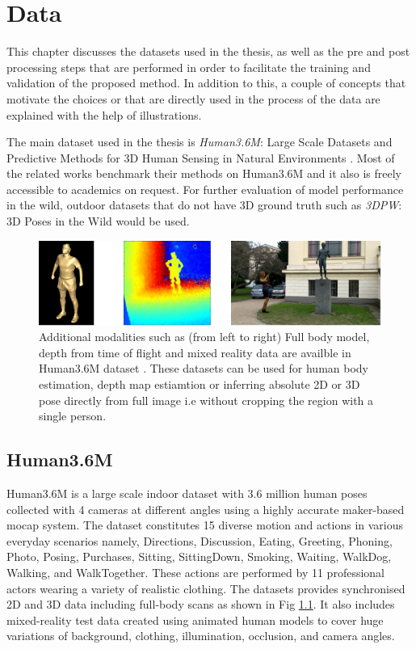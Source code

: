 \chapter{Data}
\label{chap:data}

This chapter discusses the datasets used in the thesis, as well as the pre and post processing steps that are performed in order to facilitate the training and validation of the proposed method. In addition to this, a couple of concepts that motivate the choices or that are directly used in the process of the data are explained with the help of illustrations. 

The main dataset used in the thesis is \textit{Human3.6M}: Large Scale Datasets and Predictive Methods for 3D Human Sensing in Natural Environments \cite{H3.6}. Most of the related works benchmark their methods on Human3.6M and it also is freely accessible to academics on request. For further evaluation of model performance in the wild, outdoor datasets that do not have 3D ground truth such as \textit{3DPW}: 3D Poses in the Wild \cite{3dpw} would be used.

\begin{figure}[h]
    \centering
    \includegraphics[width=\textwidth]{figures/h36/modlities.png}
    \caption{Additional modalities such as (from left to right) Full body model, depth from time of flight and mixed reality data are availble in Human3.6M dataset \cite{H3.6}. These datasets can be used for human body estimation, depth map estiamtion or inferring absolute 2D or 3D pose directly from full image i.e without cropping the region with a single person.}
    \label{fig:h36_modality}
\end{figure}

\section{Human3.6M}
Human3.6M is a large scale indoor dataset with 3.6 million human poses collected with 4 cameras at different angles using a highly accurate maker-based \ac{mocap} system. The dataset constitutes 15 diverse motion and actions in various everyday scenarios namely, Directions, Discussion, Eating, Greeting, Phoning, Photo, Posing, Purchases, Sitting, SittingDown, Smoking, Waiting, WalkDog, Walking, and WalkTogether. These actions are performed by 11 professional actors wearing a variety of realistic clothing. The datasets provides synchronised 2D and 3D data including full-body scans as shown in Fig \ref{fig:h36_modality}. It also includes mixed-reality test data created using animated human models to cover huge variations of background, clothing, illumination, occlusion, and camera angles.

